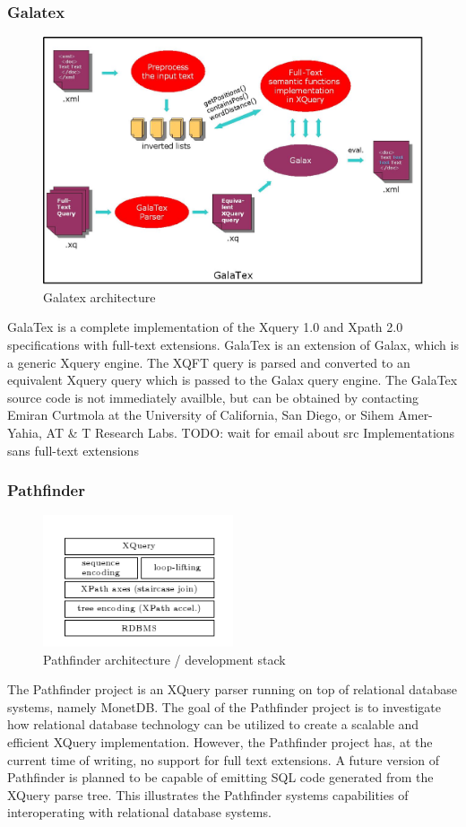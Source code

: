 \subsubsection{Galatex}
\begin{figure}[!h]
  \centering
    \includegraphics[width=1\textwidth]{img/galatex_architecture.png}
  \caption{Galatex architecture}
\end{figure}
GalaTex is a complete implementation of the Xquery 1.0 and Xpath 2.0 specifications with full-text extensions. GalaTex is an extension of Galax, which is a generic Xquery engine. The XQFT query is parsed and converted to an equivalent Xquery query which is passed to the Galax query engine. The GalaTex source code is not immediately availble, but can be obtained by contacting Emiran Curtmola at the University of California, San Diego, or Sihem Amer-Yahia, AT \& T Research Labs. 
TODO: wait for email about src
Implementations sans full-text extensions

\subsubsection{Pathfinder}
\begin{figure}[!h]
  \centering
    \includegraphics[width=0.5\textwidth]{img/pathfinder_architecture.png}
  \caption{Pathfinder architecture / development stack}
\end{figure}
The Pathfinder project is an XQuery parser running on top of relational database systems, namely MonetDB. The goal of the Pathfinder project is to investigate how relational database technology can be utilized to create a scalable and efficient XQuery implementation. However, the Pathfinder project has, at the current time of writing, no support for full text extensions. A future version of Pathfinder is planned to be capable of emitting SQL code generated from the XQuery parse tree. This illustrates the Pathfinder systems capabilities of interoperating with relational database systems.

